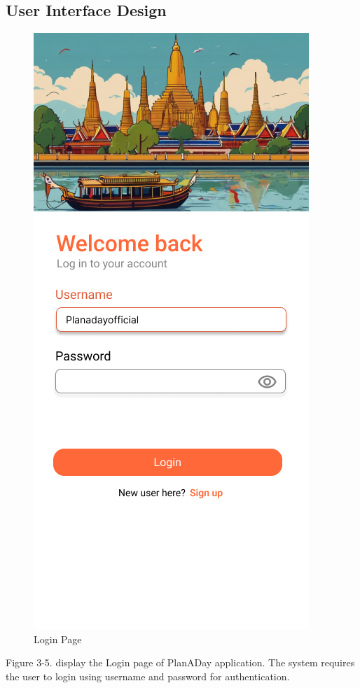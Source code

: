 \subsection{User Interface Design}
\vspace{1cm}
\begin{figure}[!h]
    \centering
    \includegraphics[width=0.5\linewidth]{chapter3/UI_Login_page.png}
    \caption{Login Page}
    \label{fig:Login Page}
\end{figure}
\noindent
Figure 3-5. display the Login page of PlanADay application. The system requires
the user to login using username and password for authentication.

